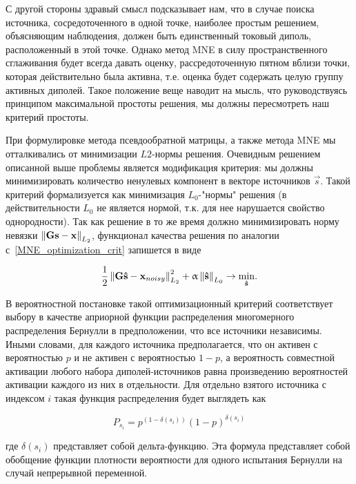 С другой стороны здравый смысл подсказывает нам, что в случае поиска источника,
сосредоточенного в одной точке, наиболее простым решением, объясняющим
наблюдения, должен быть единственный токовый диполь, расположенный в этой
точке. Однако метод MNE в силу пространственного сглаживания будет всегда
давать оценку, рассредоточенную пятном вблизи точки, которая действительно была
активна, т.е. оценка будет содержать целую группу активных диполей.
Такое положение веще наводит на мысль, что руководствуясь принципом
максимальной простоты решения, мы должны пересмотреть наш критерий простоты.

При формулировке метода псевдообратной матрицы, а также метода MNE мы
отталкивались от минимизации $L2$-нормы решения. Очевидным решением описанной
выше проблемы является модификация критерия: мы должны минимизировать
количество ненулевых компонент в векторе источников $\vec{s}$. Такой
критерий формализуется как минимизация $L_0$-"нормы" решения (в действительности $L_0$ не является нормой,
т.к. для нее нарушается свойство однородности). Так как решение в то же время
должно минимизировать норму невязки $\left\lVert\mathbf{Gs - x}\right\rVert_{L_2}$, функционал
качества решения по аналогии с~\ref{MNE_optimization_crit} запишется в виде

\begin{equation}
    \frac{1}{2}\left\lVert\mathbf{G\hat{s} - x}_{noisy}\right\rVert^2_{L_2} + \upalpha\left\lVert\mathbf{\hat{s}}\right\rVert_{L_0}
    \rightarrow \underset{\mathbf{\hat{s}}}{\min}.
    \label{l0_optimization_crit}
\end{equation}

В вероятностной постановке такой оптимизационный критерий соответствует
выбору в качестве априорной функции распределения многомерного распределения
Бернулли в предположении, что все источники независимы. Иными словами,
для каждого источника предполагается, что он активен с вероятностью
$p$ и не активен с вероятностью $1-p$, а вероятность совместной активации
любого набора диполей-источников равна произведению вероятностей активации
каждого из них в отдельности.
Для отдельно взятого источника с индексом
$i$ такая функция распределения будет выглядеть как

\begin{equation}
    P_{s_i} = p^{(1 - \delta(s_i))} (1-p)^{\delta(s_i)}
\end{equation}

где $\delta(s_i)$ представляет собой дельта-функцию. Эта формула представляет
собой обобщение функции плотности вероятности для одного испытания Бернулли
на случай непрерывной переменной.

